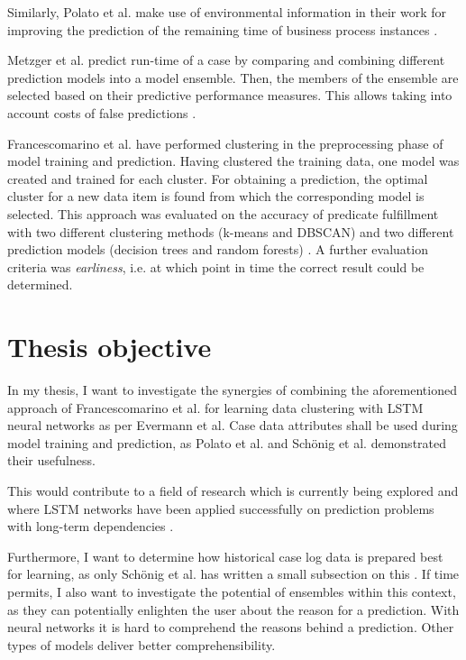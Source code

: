 \documentclass[%
	paper=A4,
	twoside=false,				%
	openright,					%
	parskip=full,				%
	chapterprefix=true,			%
	11pt,						%
	headings=normal,			%
	bibliography=totoc,			%
	listof=totoc,				%
	titlepage=on,				%
	captions=tableabove,		%
	draft=false,				%
]{scrreprt}
\begin{document}
Similarly, Polato et al. make use of environmental information in their work for improving the prediction of the remaining time of business process instances \cite{polato2014}.

Metzger et al. predict run-time of a case by comparing and combining different prediction models into a model ensemble.
Then, the members of the ensemble are selected based on their predictive performance measures.
This allows taking into account costs of false predictions \cite{metzger2015}.

Francescomarino et al. have performed clustering in the preprocessing phase of model training and prediction.
Having clustered the training data, one model was created and trained for each cluster.
For obtaining a prediction, the optimal cluster for a new data item is found from which the corresponding model is selected.
This approach was evaluated on the accuracy of predicate fulfillment with two different clustering methods (k-means and DBSCAN) and two different prediction models (decision trees and random forests) \cite{francescomarino2015}.
A further evaluation criteria was \textit{earliness}, i.e. at which point in time the correct result could be determined.

\section*{Thesis objective}
In my thesis, I want to investigate the synergies of combining the aforementioned approach of Francescomarino et al. for learning data clustering with LSTM neural networks as per Evermann et al. Case data attributes shall be used during model training and prediction, as Polato et al. \cite{polato2014} and Schönig et al. \cite{schoenig2018} demonstrated their usefulness.

This would contribute to a field of research which is currently being explored and where LSTM networks have been applied successfully on prediction problems with long-term dependencies \cite{evermann2016, tax2017, schoenig2018, graves2005}.

Furthermore, I want to determine how historical case log data is prepared best for learning, as only Schönig et al. has written a small subsection on this \cite{schoenig2018}.
If time permits, I also want to investigate the potential of ensembles within this context, as they can potentially enlighten the user about the reason for a prediction.
With neural networks it is hard to comprehend the reasons behind a prediction.
Other types of models deliver better comprehensibility.
\end{document}
